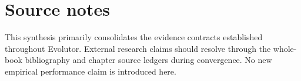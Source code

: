 \chapter*{Source notes}
This synthesis primarily consolidates the evidence contracts established throughout Evolutor. External research claims should resolve through the whole-book bibliography and chapter source ledgers during convergence. No new empirical performance claim is introduced here.
